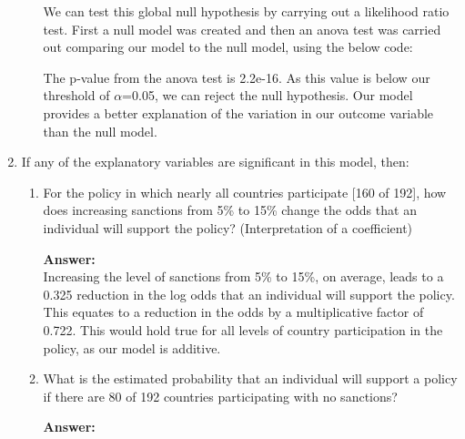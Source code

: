 \documentclass[12pt,letterpaper]{article}
\begin{document}
\begin{enumerate}
\begin{enumerate}
		We can test this global null hypothesis by carrying out a likelihood ratio test. First a null model was created and then an anova test was carried out comparing our model to the null model, using the below code:
		
		\vspace{.5cm}
		  
		\vspace{.5cm} 
		
		The p-value from the anova test is 2.2e-16. As this value is below our threshold of $\alpha$=0.05, we can reject the null hypothesis. Our model provides a better explanation of the variation in our outcome variable than the null model.
		
	
		
		
		
	\end{enumerate}
	
	\pagebreak
	
	\item
	If any of the explanatory variables are significant in this model, then:
	\begin{enumerate}
		\item
		For the policy in which nearly all countries participate [160 of 192], how does increasing sanctions from 5\% to 15\% change the odds that an individual will support the policy? (Interpretation of a coefficient)
		
		\vspace{.5cm}
		\textbf{Answer:}\\
		
		Increasing the level of sanctions from 5\% to 15\%, on average, leads to a 0.325 reduction in the log odds that an individual will support the policy. This equates to a reduction in the odds by a multiplicative factor of 0.722. This would hold true for all levels of country participation in the policy, as our model is additive.\\
		
		\item
		What is the estimated probability that an individual will support a policy if there are 80 of 192 countries participating with no sanctions?
		
		\vspace{.5cm}
		\textbf{Answer:}\\
		

\end{enumerate}
\end{enumerate}
\end{document}
